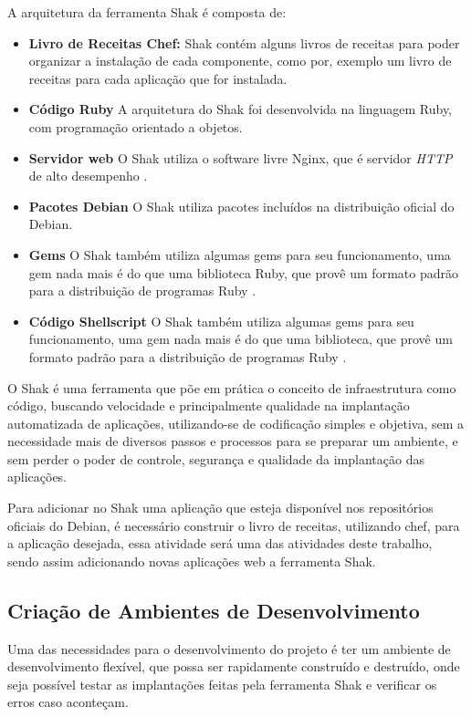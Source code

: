 A arquitetura da ferramenta Shak é composta de:

\begin{itemize}
  \item  \textbf{Livro de Receitas Chef:} Shak contém alguns livros de receitas
  para poder organizar a instalação de cada componente, como por, exemplo um livro
  de receitas para cada aplicação que for instalada.
  \item  \textbf{Código Ruby} A arquitetura do Shak foi desenvolvida na linguagem
  Ruby, com programação orientado a objetos.
  \item  \textbf{Servidor web} O Shak utiliza o software livre Nginx, que é
  servidor \textit{HTTP} de alto desempenho \cite{nginx}.
  \item  \textbf{Pacotes Debian} O Shak utiliza pacotes incluídos na distribuição
  oficial do Debian.
  \item  \textbf{Gems} O Shak também utiliza algumas gems para seu funcionamento,
  uma gem nada mais é do que uma biblioteca Ruby, que provê um formato padrão para
  a distribuição de programas Ruby \cite{gem}.
  \item  \textbf{Código Shellscript} O Shak também utiliza algumas gems para seu funcionamento,
  uma gem nada mais é do que uma biblioteca, que provê um formato padrão para
  a distribuição de programas Ruby \cite{gem}.
\end{itemize}

O Shak é uma ferramenta que põe em prática o conceito de infraestrutura
como código, buscando velocidade e principalmente qualidade na implantação
automatizada de aplicações, utilizando-se de codificação simples e objetiva,
sem a necessidade mais de diversos passos e processos para se preparar um ambiente,
e sem perder o poder de controle, segurança e qualidade da implantação das aplicações.

Para adicionar no Shak uma aplicação que esteja disponível nos repositórios oficiais
do Debian, é necessário construir o livro de receitas, utilizando chef, para a
aplicação desejada, essa atividade será uma das atividades deste trabalho, sendo assim
adicionando novas aplicações web a ferramenta Shak.

\subsection{Criação de Ambientes de Desenvolvimento}

Uma das necessidades para o desenvolvimento do projeto é ter um ambiente de desenvolvimento
flexível, que possa ser rapidamente construído e destruído, onde seja possível 
testar as implantações feitas pela ferramenta Shak e verificar os erros caso 
aconteçam. 

